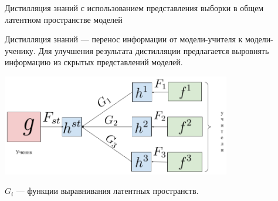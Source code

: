 \documentclass{beamer}
\begin{document}
\begin{frame}{Дистилляция знаний с использованием представления выборки в общем латентном пространстве моделей}

{\color{red}Дистилляция знаний} ---  перенос информации от {\color{red}модели-учителя} к {\color{red}модели-ученику}. Для улучшения результата дистилляции предлагается выровнять  информацию из скрытых представлений моделей.

\includegraphics[width=10cm]{../figures/fig1.png}

{\color{red}$G_i$} --- функции выравнивания латентных пространств.
\end{frame}


\end{document}
